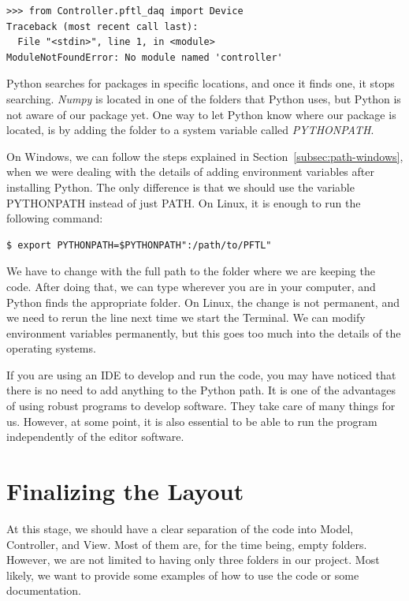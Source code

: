 \begin{verbatim}
>>> from Controller.pftl_daq import Device
Traceback (most recent call last):
  File "<stdin>", line 1, in <module>
ModuleNotFoundError: No module named 'controller'
\end{verbatim}

Python searches for packages in specific locations, and once it finds one, it stops searching. \emph{Numpy} is located in one of the folders that Python uses, but Python is not aware of our package yet. One way to let Python know where our package is located, is by adding the folder to a system variable called \emph{PYTHONPATH}.

On Windows, we can follow the steps explained in Section~\ref{subsec:path-windows}, when we were dealing with the details of adding environment variables after installing Python. The only difference is that we should use the variable PYTHONPATH instead of just PATH. On Linux, it is enough to run the following command:

\begin{verbatim}
$ export PYTHONPATH=$PYTHONPATH":/path/to/PFTL"
\end{verbatim}

We have to change  with the full path to the folder where we are keeping the code. After doing that, we can type  wherever you are in your computer, and Python finds the appropriate folder. On Linux, the change is not permanent, and we need to rerun the line next time we start the Terminal. We can modify environment variables permanently, but this goes too much into the details of the operating systems.

If you are using an IDE to develop and run the code, you may have noticed that there is no need to add anything to the Python path. It is one of the advantages of using robust programs to develop software. They take care of many things for us. However, at some point, it is also essential to be able to run the program independently of the editor software.

\section{Finalizing the Layout}\label{sec:final-layout}
At this stage, we should have a clear separation of the code into Model, Controller, and View. Most of them are, for the time being, empty folders. However, we are not limited to having only three folders in our project. Most likely, we want to provide some examples of how to use the code or some documentation.

